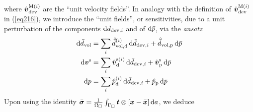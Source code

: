 \documentclass[10pt,a4paper]{article}
\newcommand{\ded}{\mathrm{d}}
\newcommand{\dep}{\mathrm{p}}
\begin{document}
where $\hat{\boldsymbol{v}}^{\mathrm{M}(i)}_{\mathrm{dev}}$ are the ``unit velocity fields''. 
In analogy with the definition of $\hat{\boldsymbol{v}}^{\mathrm{M}(i)}_{\mathrm{dev}}$
in (\ref{eq216}), we introduce the ``unit fields'', or sensitivities, due to a unit perturbation of the components $\operatorname{d \!}\bar{d}_{\mathrm{dev},i}$ and of $\operatorname{d \!}\bar{p}$, via the \emph{ansatz}
\begin{align}
    \dif\bar{d}_\vol &= \sum_i \hat{\bar{d}}_{\vol,\ded}^{(i)}\dif\bar{d}_{\dev,i} + \hat{\bar{d}}_{\vol,\dep} \dif \bar{p}
\\
    \dif\ta v^\fluct &= \sum_i \hat{\ta{v}}_{\ded}^{\fluct(i)}\dif\bar{d}_{\dev,i} + \hat{\ta v}_{\dep}^\fluct \dif \bar{p}
\\
    \dif p           &= \sum_i \hat{p}_{\ded}^{(i)}\dif\bar{d}_{\dev,i} + \hat{p}_{\dep} \dif \bar{p}
\end{align}
Upon using the identity $\bar{\boldsymbol{\sigma}}=\frac{1}{\Omega_\Box} \int_{\Gamma_\Box} \boldsymbol{t} \mathbin{\otimes} [\boldsymbol{x} - \bar{\boldsymbol{x}}]\operatorname{d \!} a$, we deduce
\end{document}
